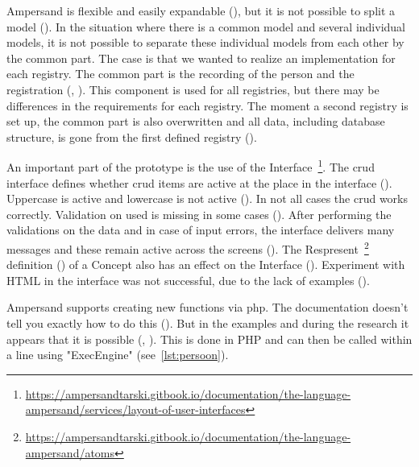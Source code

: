 Ampersand is flexible and easily expandable (), but it is not possible to split a model ().
In the situation where there is a common model and several individual models, it is not possible to separate these individual models from each other by the common part.
The case is that we wanted to realize an implementation for each registry.
The common part is the recording of the person and the registration (, ).
This component is used for all registries, but there may be differences in the requirements for each registry.
The moment a second registry is set up, the common part is also overwritten and all data, including database structure, is gone from the first defined registry ().

An important part of the prototype is the use of the Interface~\footnote{\url{https://ampersandtarski.gitbook.io/documentation/the-language-ampersand/services/layout-of-user-interfaces}}.
The \acrshort{crud} interface defines whether \acrshort{crud} items are active at the place in the interface ().
Uppercase is active and lowercase is not active ().
In not all cases the \acrshort{crud} works correctly.
Validation on used is missing in some cases ().
After performing the validations on the data and in case of input errors, the interface delivers many messages and these remain active across the screens ().
The Respresent~\footnote{\url{https://ampersandtarski.gitbook.io/documentation/the-language-ampersand/atoms}} definition () of a Concept also has an effect on the Interface ().
Experiment with HTML in the interface was not successful, due to the lack of examples ().

Ampersand supports creating new functions via php.
The documentation doesn't tell you exactly how to do this ().
But in the examples and during the research it appears that it is possible (, ).
This is done in PHP and can then be called within a line using "ExecEngine" (see~\ref{lst:persoon}).

